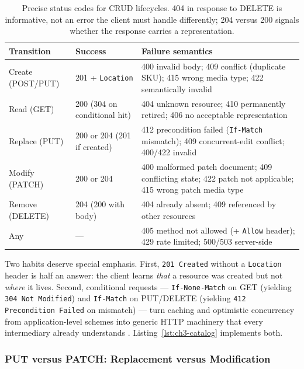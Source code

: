 \begin{table}[h]
  \centering
  \small
  \begin{tabularx}{\textwidth}{l l X}
    \toprule
    \textbf{Transition} & \textbf{Success} & \textbf{Failure semantics} \\
    \midrule
    Create (POST/PUT) & 201 + \texttt{Location} &
      400 invalid body; 409 conflict (duplicate SKU); 415 wrong media type; 422 semantically invalid \\
    Read (GET)        & 200 (304 on conditional hit) &
      404 unknown resource; 410 permanently retired; 406 no acceptable representation \\
    Replace (PUT)     & 200 or 204 (201 if created) &
      412 precondition failed (\texttt{If-Match} mismatch); 409 concurrent-edit conflict; 400/422 invalid \\
    Modify (PATCH)    & 200 or 204 &
      400 malformed patch document; 409 conflicting state; 422 patch not applicable; 415 wrong patch media type \\
    Remove (DELETE)   & 204 (200 with body) &
      404 already absent; 409 referenced by other resources \\
    Any               & --- &
      405 method not allowed (+ \texttt{Allow} header); 429 rate limited; 500/503 server-side \\
    \bottomrule
  \end{tabularx}
  \caption{Precise status codes for CRUD lifecycles. 404 in response to DELETE
  is informative, not an error the client must handle differently; 204 versus
  200 signals whether the response carries a representation.}
  \label{tab:ch3-status}
\end{table}

Two habits deserve special emphasis. First, \texttt{201 Created} without a
\texttt{Location} header is half an answer: the client learns \emph{that} a
resource was created but not \emph{where} it lives. Second, conditional requests
--- \texttt{If-None-Match} on GET (yielding \texttt{304 Not Modified}) and
\texttt{If-Match} on PUT/DELETE (yielding \texttt{412 Precondition Failed} on
mismatch) --- turn caching and optimistic concurrency from application-level
schemes into generic HTTP machinery that every intermediary already understands
\cite{rfc9110}. Listing~\ref{lst:ch3-catalog} implements both.

\subsubsection{PUT versus PATCH: Replacement versus Modification}

